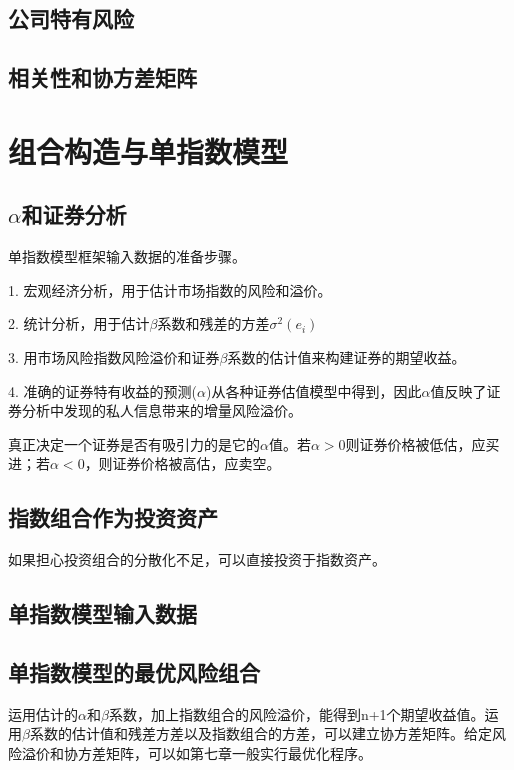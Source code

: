 \documentclass{article}
\begin{document}
\subsection{公司特有风险}

\subsection{相关性和协方差矩阵}


\section{组合构造与单指数模型}
\subsection{$ \alpha $和证券分析}
单指数模型框架输入数据的准备步骤。

1. 宏观经济分析，用于估计市场指数的风险和溢价。

2. 统计分析，用于估计$ \beta $系数和残差的方差$ \sigma^2(e_i) $

3. 用市场风险指数风险溢价和证券$ \beta $系数的估计值来构建证券的期望收益。

4. 准确的证券特有收益的预测($ \alpha $)从各种证券估值模型中得到，因此$ \alpha $值反映了证券分析中发现的私人信息带来的增量风险溢价。

\hspace*{\fill}

真正决定一个证券是否有吸引力的是它的$ \alpha $值。若$ \alpha>0 $则证券价格被低估，应买进；若$ \alpha<0 $，则证券价格被高估，应卖空。

\subsection{指数组合作为投资资产}
如果担心投资组合的分散化不足，可以直接投资于指数资产。

\subsection{单指数模型输入数据}

\subsection{单指数模型的最优风险组合}
运用估计的$ \alpha $和$ \beta $系数，加上指数组合的风险溢价，能得到n+1个期望收益值。运用$ \beta $系数的估计值和残差方差以及指数组合的方差，可以建立协方差矩阵。给定风险溢价和协方差矩阵，可以如第七章一般实行最优化程序。
\end{document}
